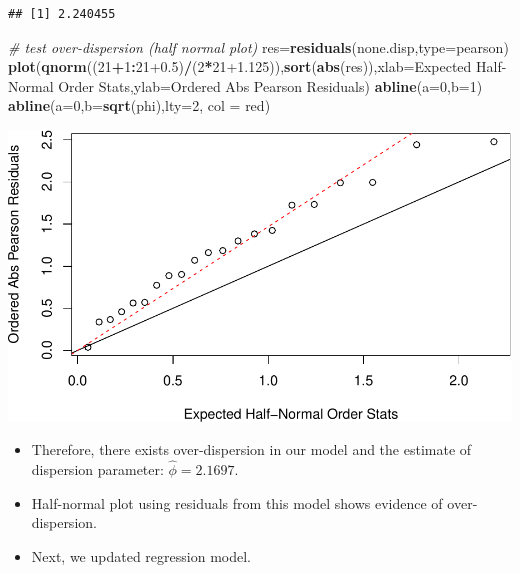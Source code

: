 \documentclass[
]{article}
\newenvironment{Shaded}{\begin{snugshade}}{\end{snugshade}}
\newcommand{\AttributeTok}[1]{\textcolor[rgb]{0.13,0.29,0.53}{#1}}
\newcommand{\CommentTok}[1]{\textcolor[rgb]{0.56,0.35,0.01}{\textit{#1}}}
\newcommand{\DecValTok}[1]{\textcolor[rgb]{0.00,0.00,0.81}{#1}}
\newcommand{\FloatTok}[1]{\textcolor[rgb]{0.00,0.00,0.81}{#1}}
\newcommand{\FunctionTok}[1]{\textcolor[rgb]{0.13,0.29,0.53}{\textbf{#1}}}
\newcommand{\NormalTok}[1]{#1}
\newcommand{\OtherTok}[1]{\textcolor[rgb]{0.56,0.35,0.01}{#1}}
\newcommand{\SpecialCharTok}[1]{\textcolor[rgb]{0.81,0.36,0.00}{\textbf{#1}}}
\newcommand{\StringTok}[1]{\textcolor[rgb]{0.31,0.60,0.02}{#1}}
\begin{document}
\begin{verbatim}
## [1] 2.240455
\end{verbatim}

\begin{Shaded}
\begin{Highlighting}[]
\CommentTok{\# test over{-}dispersion (half normal plot)}
\NormalTok{res}\OtherTok{=}\FunctionTok{residuals}\NormalTok{(none.disp,}\AttributeTok{type=}\StringTok{\textquotesingle{}pearson\textquotesingle{}}\NormalTok{)}
\FunctionTok{plot}\NormalTok{(}\FunctionTok{qnorm}\NormalTok{((}\DecValTok{21}\SpecialCharTok{+}\DecValTok{1}\SpecialCharTok{:}\DecValTok{21}\FloatTok{+0.5}\NormalTok{)}\SpecialCharTok{/}\NormalTok{(}\DecValTok{2}\SpecialCharTok{*}\DecValTok{21}\FloatTok{+1.125}\NormalTok{)),}\FunctionTok{sort}\NormalTok{(}\FunctionTok{abs}\NormalTok{(res)),}\AttributeTok{xlab=}\StringTok{\textquotesingle{}Expected Half{-}Normal Order Stats\textquotesingle{}}\NormalTok{,}\AttributeTok{ylab=}\StringTok{\textquotesingle{}Ordered Abs Pearson Residuals\textquotesingle{}}\NormalTok{)}
\FunctionTok{abline}\NormalTok{(}\AttributeTok{a=}\DecValTok{0}\NormalTok{,}\AttributeTok{b=}\DecValTok{1}\NormalTok{)}
\FunctionTok{abline}\NormalTok{(}\AttributeTok{a=}\DecValTok{0}\NormalTok{,}\AttributeTok{b=}\FunctionTok{sqrt}\NormalTok{(phi),}\AttributeTok{lty=}\DecValTok{2}\NormalTok{, }\AttributeTok{col =} \StringTok{\textquotesingle{}red\textquotesingle{}}\NormalTok{)}
\end{Highlighting}
\end{Shaded}

\includegraphics{yc4384_hw3_files/figure-latex/unnamed-chunk-5-1.pdf}

\begin{itemize}
\item
  Therefore, there exists over-dispersion in our model and the estimate
  of dispersion parameter: \(\hat{\phi} = 2.1697\).
\item
  Half-normal plot using residuals from this model shows evidence of
  over-dispersion.
\item
  Next, we updated regression model.
\end{itemize}
\end{document}
